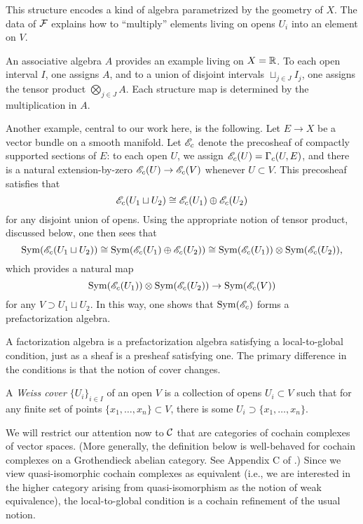 This structure encodes a kind of algebra parametrized by the geometry of $X$.
The data of $\mathcal F$ explains how to ``multiply'' elements living on opens $U_i$ into an element on $V$.

An associative algebra $A$ provides an example living on $X = \mathbb R$.
To each open interval $I$, one assigns $A$, and 
to a union of disjoint intervals $\sqcup_{j \in J} I_j$, one assigns the tensor product $\bigotimes_{j \in J} A$.
Each structure map is determined by the multiplication in $A$.

Another example, central to our work here, is the following. 
Let $E \to X$ be a vector bundle on a smooth manifold.
Let $\mathscr E_c$ denote the precosheaf of compactly supported sections of $E$:
to each open $U$, we assign $\mathscr E_c(U) = \Gamma_c(U,E)$, and 
there is a natural extension-by-zero $\mathscr E_c(U) \to \mathscr E_c(V)$ whenever $U \subset V$.
This precosheaf satisfies that
\[
\mathscr E_c( U_1 \sqcup U_2) \cong \mathscr E_c(U_1) \oplus \mathscr E_c(U_2)
\]
for any disjoint union of opens. 
Using the appropriate notion of tensor product, discussed below, 
one then sees that
\[
{\rm Sym}(\mathscr E_c( U_1 \sqcup U_2)) \cong {\rm Sym}(\mathscr E_c(U_1) \oplus \mathscr E_c(U_2)) \cong {\rm Sym}(\mathscr E_c(U_1)) \otimes {\rm Sym}(\mathscr E_c(U_2)),
\]
which provides a natural map 
\[
{\rm Sym}(\mathscr E_c(U_1)) \otimes {\rm Sym}(\mathscr E_c(U_2)) \to{\rm Sym}(\mathscr E_c(V))
\]
for any $V \supset U_1 \sqcup U_2$.
In this way, one shows that ${\rm Sym}(\mathscr E_c)$ forms a prefactorization algebra.

A factorization algebra is a prefactorization algebra satisfying a local-to-global condition,
just as a sheaf is a presheaf satisfying one.
The primary difference in the conditions is that the notion of cover changes.

\begin{dfn}
A \emph{Weiss cover} $\{U_i\}_{i \in I}$ of an open $V$ is a collection 
of opens $U_i \subset V$ such that for any finite set of points $\{x_1,\ldots,x_n\} \subset V$,
there is some $U_i \supset \{x_1,\ldots,x_n\}$.
\end{dfn}

We will restrict our attention now to $\mathcal C$ that are categories of cochain complexes of vector spaces.
(More generally, the definition below is well-behaved for cochain complexes on a Grothendieck abelian category.
See Appendix C of \cite{CG1}.)
Since we view quasi-isomorphic cochain complexes as equivalent 
(i.e., we are interested in the higher category arising from quasi-isomorphism as the notion of weak equivalence),
the local-to-global condition is a cochain refinement of the usual notion.


